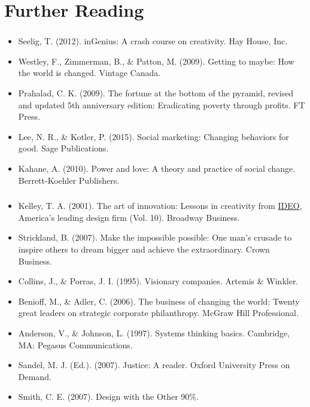 \documentclass[dvipdfmx,10pt]{beamer}
\newcommand{\ft}{\frametitle}
\begin{document}
\section{Further Reading}
\begin{frame}\ft{\insertsection}
\footnotesize
\begin{itemize}
    \item Seelig, T. (2012). inGenius: A crash course on creativity. Hay House, Inc.
    \item Westley, F., Zimmerman, B., \& Patton, M. (2009). Getting to maybe: How the world is changed. Vintage Canada.
    \item Prahalad, C. K. (2009). The fortune at the bottom of the pyramid, revised and updated 5th anniversary edition: Eradicating poverty through profits. FT Press.
    \item Lee, N. R., \& Kotler, P. (2015). Social marketing: Changing behaviors for good. Sage Publications.
    \item Kahane, A. (2010). Power and love: A theory and practice of social change. Berrett-Koehler Publishers.
\end{itemize}
\normalsize
\end{frame}
\begin{frame}\ft{\insertsection}
\footnotesize
\begin{itemize}
        \item Kelley, T. A. (2001). The art of innovation: Lessons in creativity from \href{https://en.wikipedia.org/wiki/IDEO}{IDEO}, America's leading design firm (Vol. 10). Broadway Business.
        \item Strickland, B. (2007). Make the impossible possible: One man's crusade to inspire others to dream bigger and achieve the extraordinary. Crown Business.
        \item Collins, J., \& Porras, J. I. (1995). Visionary companies. Artemis \& Winkler.
        \item Benioff, M., \& Adler, C. (2006). The business of changing the world: Twenty great leaders on strategic corporate philanthropy. McGraw Hill Professional.
        \item Anderson, V., \& Johnson, L. (1997). Systems thinking basics. Cambridge, MA: Pegasus Communications.
        \item Sandel, M. J. (Ed.). (2007). Justice: A reader. Oxford University Press on Demand.
        \item Smith, C. E. (2007). Design with the Other 90\%.
\end{itemize}
\normalsize
\end{frame}
\end{document}
